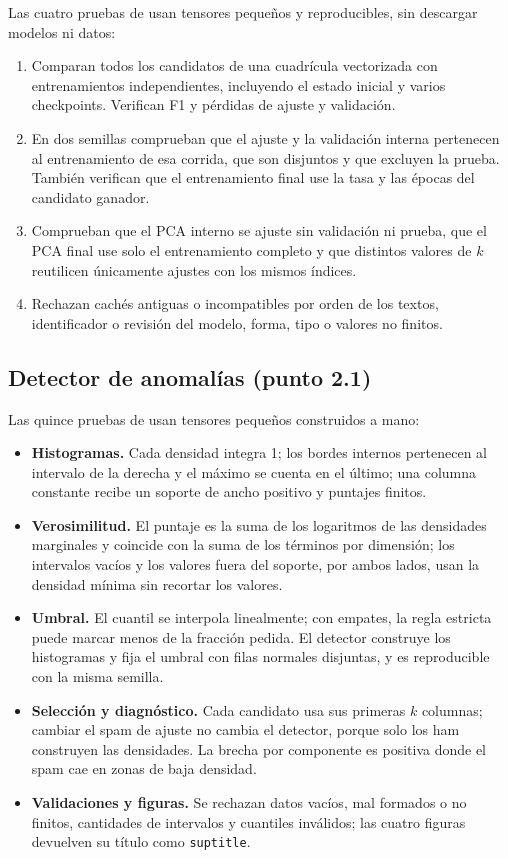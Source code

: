 Las cuatro pruebas de  usan
tensores pequeños y reproducibles, sin descargar modelos ni datos:

\begin{enumerate}
    \item Comparan todos los candidatos de una cuadrícula vectorizada con
    entrenamientos independientes, incluyendo el estado inicial y varios
    checkpoints. Verifican F1 y pérdidas de ajuste y validación.
    \item En dos semillas comprueban que el ajuste y la validación interna
    pertenecen al entrenamiento de esa corrida, que son disjuntos y que
    excluyen la prueba. También verifican que el entrenamiento final use la
    tasa y las épocas del candidato ganador.
    \item Comprueban que el PCA interno se ajuste sin validación ni prueba,
    que el PCA final use solo el entrenamiento completo y que distintos
    valores de $k$ reutilicen únicamente ajustes con los mismos índices.
    \item Rechazan cachés antiguas o incompatibles por orden de los textos,
    identificador o revisión del modelo, forma, tipo o valores no finitos.
\end{enumerate}

\subsection{Detector de anomalías (punto 2.1)}

Las quince pruebas de  usan
tensores pequeños construidos a mano:

\begin{itemize}
    \item \textbf{Histogramas.} Cada densidad integra 1; los bordes internos
    pertenecen al intervalo de la derecha y el máximo se cuenta en el último;
    una columna constante recibe un soporte de ancho positivo y puntajes
    finitos.
    \item \textbf{Verosimilitud.} El puntaje es la suma de los logaritmos de
    las densidades marginales y coincide con la suma de los términos por
    dimensión; los intervalos vacíos y los valores fuera del soporte, por
    ambos lados, usan la densidad mínima sin recortar los valores.
    \item \textbf{Umbral.} El cuantil se interpola linealmente; con empates,
    la regla estricta puede marcar menos de la fracción pedida. El detector
    construye los histogramas y fija el umbral con filas normales disjuntas,
    y es reproducible con la misma semilla.
    \item \textbf{Selección y diagnóstico.} Cada candidato usa sus primeras
    $k$ columnas; cambiar el spam de ajuste no cambia el detector, porque
    solo los ham construyen las densidades. La brecha por componente es
    positiva donde el spam cae en zonas de baja densidad.
    \item \textbf{Validaciones y figuras.} Se rechazan datos vacíos, mal
    formados o no finitos, cantidades de intervalos y cuantiles inválidos; las
    cuatro figuras devuelven su título como \texttt{suptitle}.
\end{itemize}

